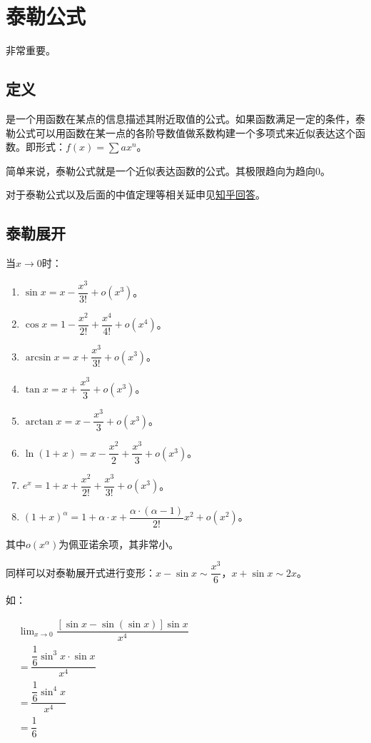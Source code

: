 \documentclass[UTF8, 12pt]{ctexart}
\begin{document}
\section{泰勒公式}

非常重要。

\subsection{定义}

是一个用函数在某点的信息描述其附近取值的公式。如果函数满足一定的条件，泰勒公式可以用函数在某一点的各阶导数值做系数构建一个多项式来近似表达这个函数。即形式：$f(x)=\sum ax^n$。

简单来说，泰勒公式就是一个近似表达函数的公式。其极限趋向为趋向0。

对于泰勒公式以及后面的中值定理等相关延申见\href{https://www.zhihu.com/question/25627482}{知乎回答}。

\subsection{泰勒展开}

当$x\to 0$时：

\begin{enumerate}
    \item $\sin x=x-\dfrac{x^3}{3!}+o(x^3)$。
    \item $\cos x=1-\dfrac{x^2}{2!}+\dfrac{x^4}{4!}+o(x^4)$。
    \item $\arcsin x=x+\dfrac{x^3}{3!}+o(x^3)$。
    \item $\tan x=x+\dfrac{x^3}{3}+o(x^3)$。
    \item $\arctan x=x-\dfrac{x^3}{3}+o(x^3)$。
    \item $\ln(1+x)=x-\dfrac{x^2}{2}+\dfrac{x^3}{3}+o(x^3)$。
    \item $e^x=1+x+\dfrac{x^2}{2!}+\dfrac{x^3}{3!}+o(x^3)$。
    \item $(1+x)^\alpha=1+\alpha\cdot x+\dfrac{\alpha\cdot(\alpha-1)}{2!}x^2+o(x^2)$。
\end{enumerate}

其中$o(x^\alpha)$为佩亚诺余项，其非常小。

同样可以对泰勒展开式进行变形：$x-\sin x\sim\dfrac{x^3}{6}$，$x+\sin x\sim 2x$。

如：

$
\begin{aligned}
    & \lim_{x\to 0}\dfrac{[\sin x-\sin(\sin x)]\sin x}{x^4} \\
    & =\dfrac{\dfrac{1}{6}\sin^3x\cdot\sin x}{x^4} \\
    & =\dfrac{\dfrac{1}{6}\sin^4x}{x^4} \\
    & =\dfrac{1}{6}
\end{aligned}
$
\end{document}
